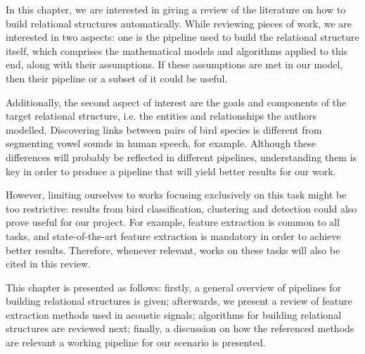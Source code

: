 \documentclass[../main.tex]{subfiles}
\begin{document}
In this chapter, we are interested in giving a review of the literature on how to build relational structures automatically. While reviewing pieces of work, we are interested in two aspects: one is the pipeline used to build the relational structure itself, which comprises the mathematical models and algorithms applied to this end, along with their assumptions. If these assumptions are met in our model, then their pipeline or a subset of it could be useful.
\par Additionally, the second aspect of interest are the goals and components of the target relational structure, i.e. the entities and relationships the authors modelled. Discovering links between pairs of bird species is different from segmenting vowel sounds in human speech, for example. Although these differences will probably be reflected in different pipelines, understanding them is key in order to produce a pipeline that will yield better results for our work.
\par However, limiting ourselves to works focusing exclusively on this task might be too restrictive: results from bird classification, clustering and detection could also prove useful for our project. For example, feature extraction is common to all tasks, and state-of-the-art feature extraction is mandatory in order to achieve better results. Therefore, whenever relevant, works on these tasks will also be cited in this review.
\par This chapter is presented as follows: firstly, a general overview of pipelines for building relational structures is given; afterwards, we present a review of feature extraction methods used in acoustic signals; algorithms for building relational structures are reviewed next; finally, a discussion on how the referenced methods are relevant a working pipeline for our scenario is presented.
\end{document}
